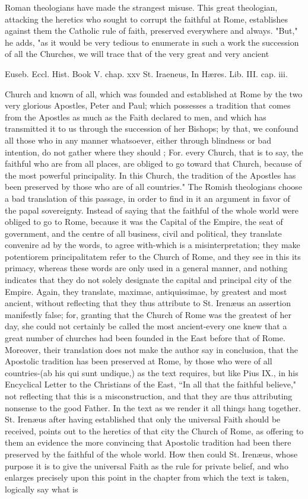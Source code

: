 Roman theologians have made the strangest misuse. This great theologian, attacking the heretics who sought to corrupt the faithful at Rome, establishes against them the Catholic rule of faith, preserved everywhere and always. "But," he adds, "as it would be very tedious to enumerate in such a work the succession of all the Churches, we will trace that of the very great and very ancient

Euseb. Eccl. Hist. Book V. chap. xxv St. Iraeneus, In Hæres. Lib. III. cap. iii.

Church and known of all, which was founded and established at Rome by the two very glorious Apostles, Peter and Paul; which possesses a tradition that comes from the Apostles as much as the Faith declared to men, and which has transmitted it to us through the succession of her Bishops; by that, we confound all those who in any manner whatsoever, either through blindness or bad intention, do not gather where they should ; For. every Church, that is to say, the faithful who are from all places, are obliged to go toward that Church, because of the most powerful principality. In this Church, the tradition of the Apostles has been preserved by those who are of all countries." The Romish theologians choose a bad translation of this passage, in order to find in it an argument in favor of the papal sovereignty. Instead of saying that the faithful of the whole world were obliged to go to Rome, because it was the Capital of the Empire, the seat of government, and the centre of all business, civil and political, they translate convenire ad by the words, to agree with-which is a misinterpretation; they make potentiorem principalitatem refer to the Church of Rome, and they see in this its primacy, whereas these words are only used in a general manner, and nothing indicates that they do not solely designate the capital and principal city of the Empire. Again, they translate, maximae, antiquissimae, by greatest and most ancient, without reflecting that they thus attribute to St. Irenæus an assertion manifestly false; for, granting that the Church of Rome was the greatest of her day, she could not certainly be called the most ancient-every one knew that a great number of churches had been founded in the East before that of Rome. Moreover, their translation does not make the author say in conclusion, that the Apostolic tradition has been preserved at Rome, by those who were of all countries-(ab his qui sunt undique,) as the text requires, but like Pius IX., in his Encyclical Letter to the Christians of the East, “In all that the faithful believe," not reflecting that this is a misconstruction, and that they are thus attributing nonsense to the good Father. In the text as we render it all things hang together. St. Irenæus after having established that only the universal Faith should be received, points out to the heretics of that city the Church of Rome, as offering to them an evidence the more convincing that Apostolic tradition had been there preserved by the faithful of the whole world. How then could St. Irenæus, whose purpose it is to give the universal Faith as the rule for private belief, and who enlarges precisely upon this point in the chapter from which the text is taken, logically say what is 